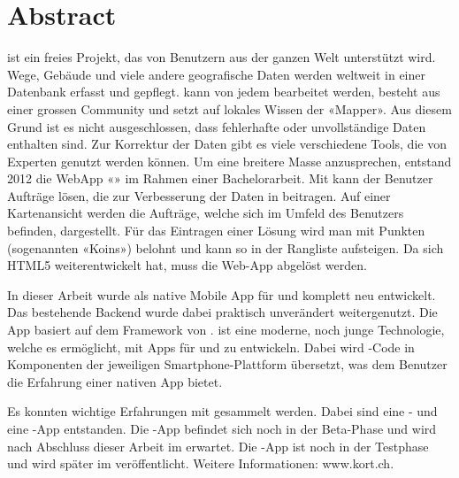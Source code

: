 \chapter*{Abstract}
\thispagestyle{scrheadings}

 ist ein freies Projekt, das von Benutzern aus der ganzen Welt unterstützt wird. 
Wege, Gebäude und viele andere geografische Daten werden weltweit in einer Datenbank erfasst und gepflegt. 
 kann von jedem bearbeitet werden, besteht aus einer grossen Community und setzt auf lokales Wissen der «\gls{Mapper}». 
Aus diesem Grund ist es nicht ausgeschlossen, dass fehlerhafte oder unvollständige Daten enthalten
sind. 
Zur Korrektur der Daten gibt es viele verschiedene Tools, die von Experten genutzt werden können. 
Um eine breitere Masse anzusprechen, entstand 2012 die \gls{WebApp} «\kort{}» im Rahmen einer Bachelorarbeit. 
Mit \kort{} kann der Benutzer Aufträge lösen, die zur Verbesserung der Daten in  beitragen. 
Auf einer Kartenansicht werden die Aufträge, welche sich im Umfeld des Benutzers befinden, dargestellt. 
Für das Eintragen einer Lösung wird man mit Punkten (sogenannten «Koins») belohnt und kann
so in der Rangliste aufsteigen. 
Da sich HTML5 weiterentwickelt hat, muss die Web-App abgelöst werden.

In dieser Arbeit wurde \kort{} als native Mobile App für  und  komplett neu entwickelt. 
Das bestehende \gls{Backend} wurde dabei praktisch unverändert weitergenutzt. 
Die App basiert auf dem  Framework von . 
 ist eine moderne, noch junge Technologie, welche es ermöglicht, mit  Apps für  und  zu entwickeln. 
Dabei wird -Code in Komponenten der jeweiligen Smartphone-Plattform übersetzt, was dem Benutzer die Erfahrung einer nativen App bietet.

Es konnten wichtige Erfahrungen mit  gesammelt werden. 
Dabei sind eine - und eine -App entstanden. 
Die -App befindet sich noch in der Beta-Phase und wird nach Abschluss dieser Arbeit im  erwartet. 
Die -App ist noch in der Testphase und wird später im   veröffentlicht. 
Weitere Informationen: www.kort.ch. 
